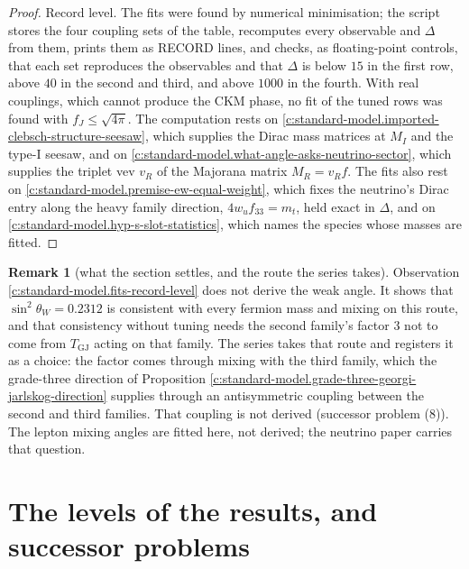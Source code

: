 \documentclass[11pt]{article}
\theoremstyle{definition}
\newtheorem{remark}[theorem]{Remark}
\theoremstyle{plain}
\begin{document}
\begin{proof}
Record level. The fits were found by numerical minimisation; the script stores the four coupling sets of the table, recomputes every observable and $\Delta$ from them, prints them as RECORD lines, and checks, as floating-point controls, that each set reproduces the observables and that $\Delta$ is below $15$ in the first row, above $40$ in the second and third, and above $1000$ in the fourth. With real couplings, which cannot produce the CKM phase, no fit of the tuned rows was found with $f_{J} \le \sqrt{4\pi}$. The computation rests on \ref{c:standard-model.imported-clebsch-structure-seesaw}, which supplies the Dirac mass matrices at $M_{I}$ and the type-I seesaw, and on \ref{c:standard-model.what-angle-asks-neutrino-sector}, which supplies the triplet vev $v_{R}$ of the Majorana matrix $M_{R} = v_{R}f$. The fits also rest on \ref{c:standard-model.premise-ew-equal-weight}, which fixes the neutrino's Dirac entry along the heavy family direction, $4w_{u}f_{33} = m_{t}$, held exact in $\Delta$, and on \ref{c:standard-model.hyp-s-slot-statistics}, which names the species whose masses are fitted.

\end{proof}

\begin{remark}[what the section settles, and the route the series takes]\label{c:note.standard-model.what-section-settles-route-series-takes}
Observation \ref{c:standard-model.fits-record-level} does not derive the weak angle. It shows that $\sin^{2}\theta_{W} = 0.2312$ is consistent with every fermion mass and mixing on this route, and that consistency without tuning needs the second family's factor $3$ not to come from $T_{\mathrm{GJ}}$ acting on that family. The series takes that route and registers it as a choice: the factor comes through mixing with the third family, which the grade-three direction of Proposition \ref{c:standard-model.grade-three-georgi-jarlskog-direction} supplies through an antisymmetric coupling between the second and third families. That coupling is not derived (successor problem (8)). The lepton mixing angles are fitted here, not derived; the neutrino paper carries that question.
\end{remark}

\section{The levels of the results, and successor problems}
\end{document}
